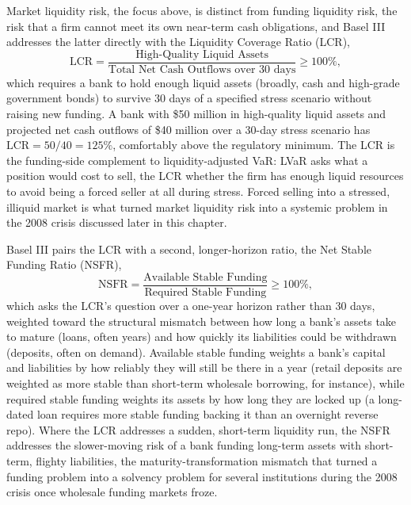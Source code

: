 \documentclass[../ai_in_finance]{subfiles}
\begin{document}
Market liquidity risk, the focus above, is distinct from funding liquidity risk, the risk that a firm cannot meet its own near-term cash obligations, and Basel III addresses the latter directly with the Liquidity Coverage Ratio (LCR),
\begin{equation*}
\text{LCR} = \frac{\text{High-Quality Liquid Assets}}{\text{Total Net Cash Outflows over 30 days}} \ge 100\%,
\end{equation*}
which requires a bank to hold enough liquid assets (broadly, cash and high-grade government bonds) to survive 30 days of a specified stress scenario without raising new funding. A bank with \$50 million in high-quality liquid assets and projected net cash outflows of \$40 million over a 30-day stress scenario has $\text{LCR} = 50/40 = 125\%$, comfortably above the regulatory minimum.
The LCR is the funding-side complement to liquidity-adjusted VaR: LVaR asks what a position would cost to sell, the LCR whether the firm has enough liquid resources to avoid being a forced seller at all during stress. Forced selling into a stressed, illiquid market is what turned market liquidity risk into a systemic problem in the 2008 crisis discussed later in this chapter.

Basel III pairs the LCR with a second, longer-horizon ratio, the Net Stable Funding Ratio (NSFR),
\begin{equation*}
\text{NSFR} = \frac{\text{Available Stable Funding}}{\text{Required Stable Funding}} \ge 100\%,
\end{equation*}
which asks the LCR's question over a one-year horizon rather than 30 days, weighted toward the structural mismatch between how long a bank's assets take to mature (loans, often years) and how quickly its liabilities could be withdrawn (deposits, often on demand).
Available stable funding weights a bank's capital and liabilities by how reliably they will still be there in a year (retail deposits are weighted as more stable than short-term wholesale borrowing, for instance), while required stable funding weights its assets by how long they are locked up (a long-dated loan requires more stable funding backing it than an overnight reverse repo).
Where the LCR addresses a sudden, short-term liquidity run, the NSFR addresses the slower-moving risk of a bank funding long-term assets with short-term, flighty liabilities, the maturity-transformation mismatch that turned a funding problem into a solvency problem for several institutions during the 2008 crisis once wholesale funding markets froze.
\end{document}
